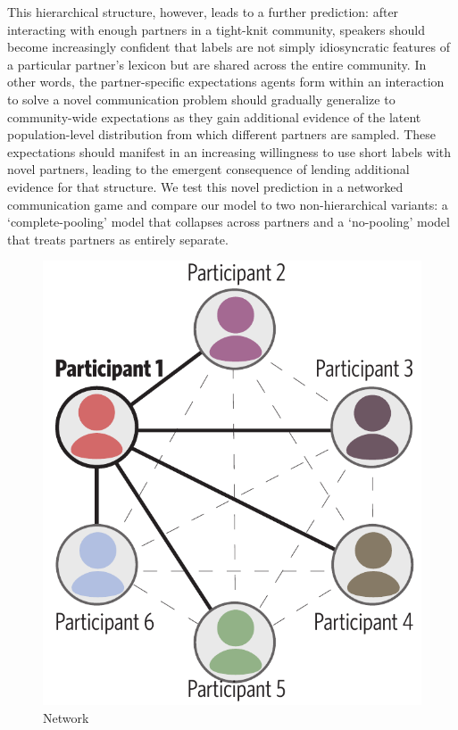 \documentclass[11pt, floatsintext]{apa6}
\begin{document}
This hierarchical structure, however, leads to a further prediction: after interacting with enough partners in a tight-knit community, speakers should become increasingly confident that labels are not simply idiosyncratic features of a particular partner's lexicon but are shared across the entire community.
In other words, the partner-specific expectations agents form within an interaction to solve a novel communication problem should gradually generalize to community-wide expectations as they gain additional evidence of the latent population-level distribution from which different partners are sampled.
These expectations should manifest in an increasing willingness to use short labels with novel partners, leading to the emergent consequence of lending additional evidence for that structure. 
We test this novel prediction in a networked communication game and compare our model to two non-hierarchical variants: a `complete-pooling' model that collapses across partners and a `no-pooling' model that treats partners as entirely separate.

\begin{figure}[t!]
\centering
    \includegraphics[scale=.32]{task1_network.pdf}
  \caption{Network}%
  \label{fig:task1_network}
\end{figure}
\end{document}
